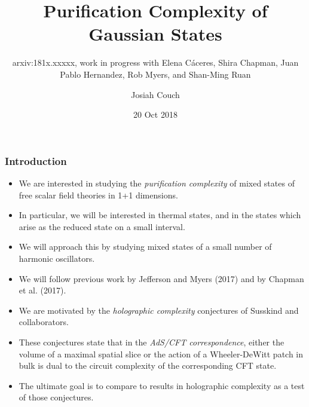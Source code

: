 \documentclass[10pt,aspectratio=169]{beamer}
\title{Purification Complexity of Gaussian States}
\subtitle{arxiv:181x.xxxxx, work in progress with Elena C\'aceres, Shira Chapman, Juan Pablo Hernandez, Rob Myers, and Shan-Ming Ruan}
\author{Josiah Couch}
\institute{University of Texas at Austin}
\date{20 Oct 2018}
\begin{document}
\begin{frame}
\titlepage\end{frame}

\begin{frame}
\frametitle{Introduction}

\begin{itemize}

\item We are interested in studying the {\it purification complexity} of mixed states of free scalar field theories in 1+1 dimensions.

\item In particular, we will be interested in thermal states, and in the states which arise as the reduced state on a small interval.

\item We will approach this by studying mixed states of a small number of harmonic oscillators.

\item We will follow previous work by Jefferson and Myers (2017) and by Chapman et al. (2017).

\item We are motivated by the {\it holographic complexity} conjectures of Susskind and collaborators.

\item These conjectures state that in the {\it AdS/CFT correspondence}, either the volume of a maximal spatial slice or the action of a Wheeler-DeWitt patch in bulk is dual to the circuit complexity of the corresponding CFT state.

\item The ultimate goal is to compare to results in holographic complexity as a test of those conjectures.

\end{itemize}

\end{frame}
\end{document}
